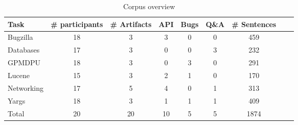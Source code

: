 
\begin{table}
\caption{Corpus overview}
\begin{scriptsize}
\begin{center}

\begin{tabular}{l|cccccccc}
\hline    
\textbf{Task} 
&  \textbf{\# participants}
&   \textbf{\# Artifacts} 
&   \textbf{API} 
&   \textbf{Bugs} 
&   \textbf{Q\&A} 
&  \textbf{\# Sentences} \\ 
\hline    
\hline
Bugzilla    & 18 & 3 & 3 & 0 & 0 & 459 \\
Databases   & 17 & 3 & 0 & 0 & 3 & 232 \\
GPMDPU      & 18 & 3 & 0 & 3 & 0 & 291 \\
Lucene      & 15 & 3 & 2 & 1 & 0 & 170 \\     
Networking  & 17 & 5 & 4 & 0 & 1 & 313 \\
Yargs       & 18 & 3 & 1 & 1 & 1 & 409 \\
\hline    
\hline 
\rowcolor{white}
Total       & 20 & 20 & 10 & 5 & 5 & 1874  \\
\hline 
\end{tabular}
\end{center}
\end{scriptsize}
\label{tbl:corpus-stats}
\end{table}
